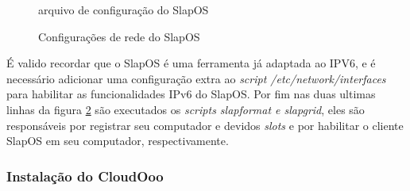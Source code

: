 \begin{figure}[ht]
    \centering
    \caption{arquivo de configuração do SlapOS}
    \label{slapos-2}
\end{figure}

\begin{figure}[ht]
    \centering
    \caption{Configurações de rede do SlapOS}
    \label{slapos-rede}
\end{figure}

É valido recordar que o SlapOS é uma ferramenta já adaptada ao IPV6, e é necessário adicionar uma configuração extra ao \textit{script /etc/network/interfaces} para habilitar as funcionalidades IPv6 do SlapOS. Por fim nas duas ultimas linhas da figura \ref{slapos-rede} são executados os \textit{scripts slapformat e slapgrid}, eles são responsáveis por registrar seu computador e devidos \textit{slots} e por habilitar o cliente SlapOS em seu computador, respectivamente.

\subsubsection{Instalação do CloudOoo}

